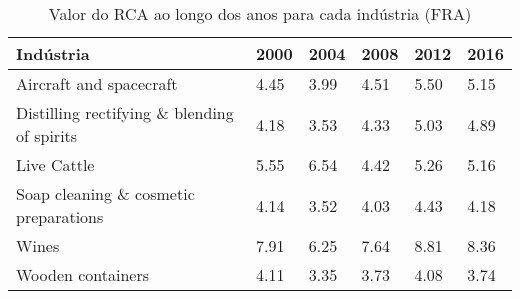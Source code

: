 \begin{table}
\centering
\caption{Valor do RCA ao longo dos anos para cada indústria (FRA)}
\label{tab:ex3-tempo-FRA}
\begin{tabular}{p{6cm}p{1.5cm}p{1.5cm}p{1.5cm}p{1.5cm}p{1.5cm}}
\toprule
                                  Indústria & 2000 & 2004 & 2008 & 2012 & 2016 \\
\midrule
                    Aircraft and spacecraft & 4.45 & 3.99 & 4.51 & 5.50 & 5.15 \\
Distilling rectifying \& blending of spirits & 4.18 & 3.53 & 4.33 & 5.03 & 4.89 \\
                                Live Cattle & 5.55 & 6.54 & 4.42 & 5.26 & 5.16 \\
      Soap cleaning \& cosmetic preparations & 4.14 & 3.52 & 4.03 & 4.43 & 4.18 \\
                                      Wines & 7.91 & 6.25 & 7.64 & 8.81 & 8.36 \\
                          Wooden containers & 4.11 & 3.35 & 3.73 & 4.08 & 3.74 \\
\bottomrule
\end{tabular}
\end{table}
